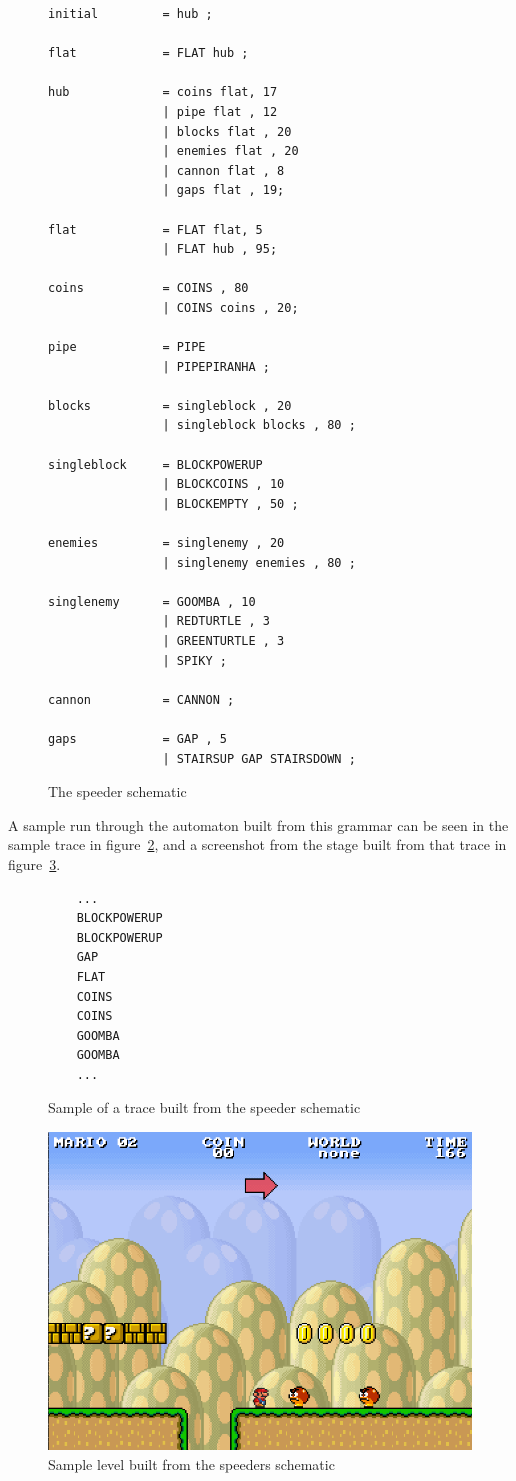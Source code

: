 \documentclass[conference]{IEEEtran}
\begin{document}
\begin{figure}[htp]
	\begin{lstlisting}
initial			= hub ;

flat			= FLAT hub ;

hub				= coins flat, 17
				| pipe flat , 12
				| blocks flat , 20
				| enemies flat , 20
				| cannon flat , 8
				| gaps flat , 19;
		
flat 			= FLAT flat, 5
				| FLAT hub , 95;

coins 			= COINS , 80
				| COINS coins , 20;

pipe 			= PIPE 
				| PIPEPIRANHA ;
		
blocks			= singleblock , 20
				| singleblock blocks , 80 ;
		
singleblock		= BLOCKPOWERUP
				| BLOCKCOINS , 10
				| BLOCKEMPTY , 50 ;
		
enemies			= singlenemy , 20
				| singlenemy enemies , 80 ;
				
singlenemy		= GOOMBA , 10
				| REDTURTLE , 3
				| GREENTURTLE , 3
				| SPIKY ;
				
cannon			= CANNON ;

gaps			= GAP , 5
				| STAIRSUP GAP STAIRSDOWN ;

	\end{lstlisting}
\caption{The speeder schematic}
\label{speedersch}
\end{figure}

A sample run through the automaton built from this grammar can be seen in the sample trace in figure~\ref{speedertrace}, and a screenshot from the stage built from that trace in figure~\ref{screenshot}.

\begin{figure}[htp]
	\begin{lstlisting}
	...
	BLOCKPOWERUP
	BLOCKPOWERUP
	GAP
	FLAT
	COINS
	COINS
	GOOMBA
	GOOMBA
	...
	\end{lstlisting}
\caption{Sample of a trace built from the speeder schematic}
\label{speedertrace}
\end{figure}

\begin{figure}[htp]
\centerline{\includegraphics[width=0.9\columnwidth]{screenshot.png}}
\label{screenshot}
\caption{Sample level built from the speeders schematic}
\end{figure}
\end{document}
